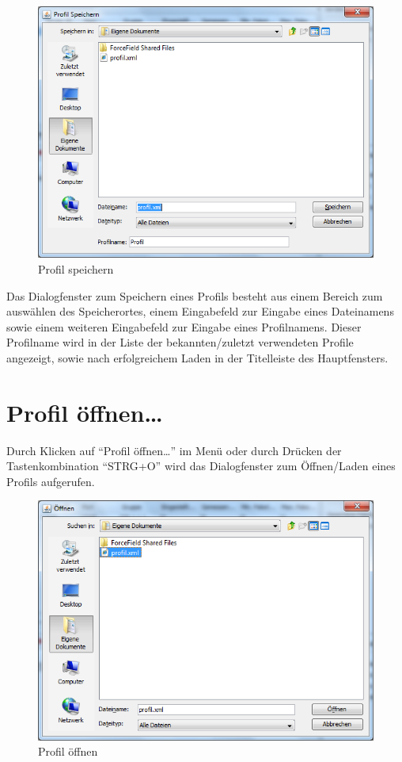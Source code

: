 \begin{figure}[htbp]
\begin{center}
\includegraphics[width=14cm]{images/saveProfile.png}
\caption[Profil speichern]{Profil speichern}
\label{saveprofile}
\end{center}
\end{figure}

Das Dialogfenster zum Speichern eines Profils besteht aus einem Bereich zum
auswählen des Speicherortes, einem Eingabefeld zur Eingabe eines Dateinamens
sowie einem weiteren Eingabefeld zur Eingabe eines Profilnamens. Dieser
Profilname wird in der Liste der bekannten/zuletzt verwendeten Profile
angezeigt, sowie nach erfolgreichem Laden in der Titelleiste des Hauptfensters.

\chapter{Profil öffnen\ldots}
Durch Klicken auf  ``Profil öffnen\ldots'' im Menü oder durch Drücken der
Tastenkombination ``STRG+O'' wird das Dialogfenster zum Öffnen/Laden eines
Profils aufgerufen. 

\begin{figure}[htbp]
\begin{center}
\includegraphics[width=14cm]{images/openProfile.png}
\caption[Profil öffnen]{Profil öffnen}
\label{openprofile}
\end{center}
\end{figure}

